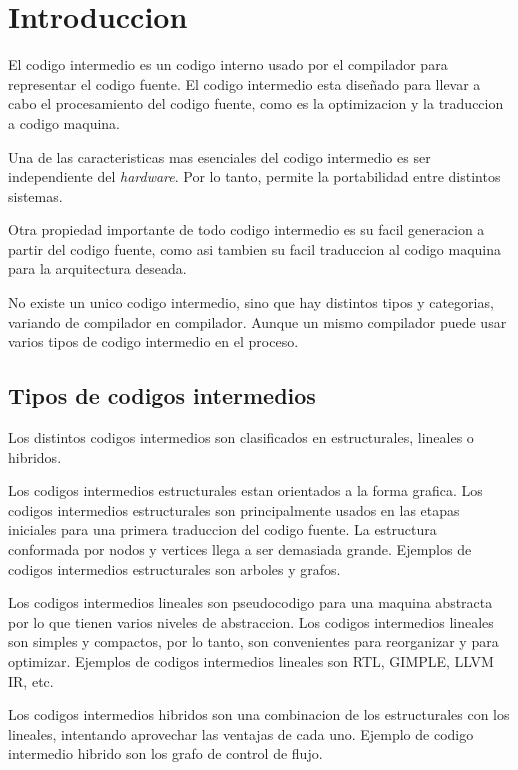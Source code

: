 \chapter{Introduccion}

El codigo intermedio es un codigo interno usado por el compilador para 
representar el codigo fuente. El codigo intermedio esta diseñado para llevar a cabo 
el procesamiento del codigo fuente, como es la optimizacion y la traduccion a codigo maquina. 

Una de las caracteristicas mas esenciales del codigo intermedio es ser 
independiente del \emph{hardware}. Por lo tanto, permite la portabilidad entre distintos 
sistemas.

Otra propiedad importante de todo codigo intermedio es su facil generacion a partir del 
codigo fuente, como asi tambien su facil traduccion al codigo maquina para la arquitectura 
deseada.

No existe un unico codigo intermedio, sino que hay distintos tipos y categorias, variando 
de compilador en compilador. Aunque un mismo compilador puede usar varios tipos de 
codigo intermedio en el proceso.

\section{Tipos de codigos intermedios}

Los distintos codigos intermedios son clasificados en estructurales, lineales o hibridos.

Los codigos intermedios estructurales estan orientados a la forma grafica. Los codigos 
intermedios estructurales son principalmente usados en las etapas iniciales para 
una primera traduccion del codigo fuente. La estructura conformada por nodos y vertices 
llega a ser demasiada grande. Ejemplos de codigos intermedios estructurales son arboles y grafos.

Los codigos intermedios lineales son pseudocodigo para una maquina abstracta por 
lo que tienen varios niveles de abstraccion. Los codigos intermedios lineales son 
simples y compactos, por lo tanto, son convenientes para reorganizar y para optimizar.
Ejemplos de codigos intermedios lineales son RTL, GIMPLE, LLVM IR, etc.

Los codigos intermedios hibridos son una combinacion de los estructurales con los 
lineales, intentando aprovechar las ventajas de cada uno. Ejemplo de codigo intermedio 
hibrido son los grafo de control de flujo.

